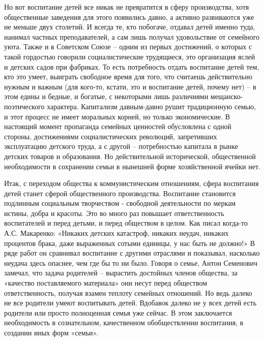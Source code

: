 \documentclass[../main]{subfiles}
\begin{document}
Но вот воспитание детей все никак не превратится в сферу производства, хотя общественные заведения для этого появились давно, а активно развиваются уже не меньше двух столетий. И всегда те, кто побогаче, отдавал детей именно туда, нанимал частных преподавателей, а сам лишь получал удовольствие от семейного уюта. Также и в Советском Союзе – одним из первых достижений, о которых с такой гордостью говорили социалистические трудящиеся, это организация яслей и детских садов при фабриках. То есть потребность отдать воспитание детей тем, кто это умеет, выиграть свободное время для того, что считаешь действительно нужным и важным (для кого-то, кстати, это и воспитание детей, почему нет) – в этом едины и бедные, и богатые, с некоторыми лишь различиями мещанско-поэтического характера. Капитализм давным-давно рушит традиционную семью, и этот процесс не имеет моральных корней, но только экономические. В настоящий момент пропаганда семейных ценностей обусловлена с одной стороны, достижениями социалистических революций, запретивших эксплуатацию детского труда, а с другой – потребностью капитала в рынке детских товаров и образования. Но действительной исторической, общественной необходимости в сохранении семьи в нынешней форме хозяйственной ячейки нет.

Итак, с переходом общества к коммунистическим отношениям, сфера воспитания детей станет сферой общественного производства. Воспитание становится подлинным социальным творчеством - свободной деятельности по меркам истины, добра и красоты. Это во много раз повышает ответственность воспитателей и перед детьми, и перед обществом в целом. Как писал когда-то А.С. Макаренко: «Никаких детских катастроф, никаких неудач, никаких процентов брака, даже выраженных сотыми единицы, у нас быть не должно!» В ряде работ он сравнивал воспитание с другими отраслями и показывал, насколько неудача здесь опаснее, чем где бы то ни было. Говоря о семье, Антон Семенович замечал, что задача родителей – вырастить достойных членов общества, за «качество поставляемого материала» они несут перед обществом ответственность, получая взамен теплоту семейных отношений. Но ведь далеко не все родители умеют воспитывать детей. Вдобавок далеко не у всех детей есть родители или просто полноценная семья уже сейчас. В этом заключается необходимость в сознательном, качественном обобществлении воспитания, в создании иных форм «семьи».
\end{document}
